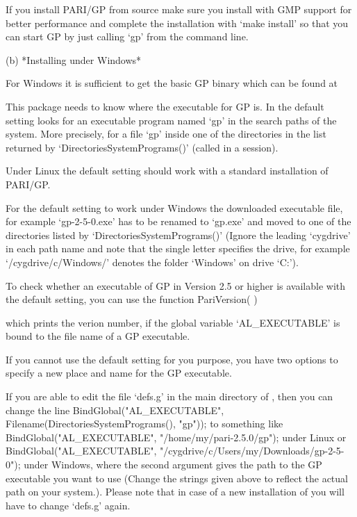 If you install PARI/GP from source make sure you install with GMP
support for better performance and complete the installation with
`make install' so that you can start GP by just calling `gp' from the
command line.

\item{(b)} 
*Installing under Windows*

For Windows it is sufficient to get the basic GP binary which can be found at
\endlist


This package needs to know where the executable for GP is. In the
default setting {\Alnuth} looks for an executable program named `gp' in
the search paths of the system. More precisely, for a file `gp' inside
one of the directories in the list returned by
`DirectoriesSystemPrograms()' (called in a {\GAP} session).

Under Linux the default setting should work with a standard
installation of PARI/GP.

For the default setting to work under Windows the downloaded
executable file, for example `gp-2-5-0.exe' has to be renamed to
`gp.exe' and moved to one of the directories listed by
`DirectoriesSystemPrograms()' (Ignore the leading `cygdrive' in each
path name and note that the single letter specifies the drive, for
example `/cygdrive/c/Windows/' denotes the folder `Windows' on drive
`C:').

To check whether an executable of GP in Version 2.5 or higher is
available with the default setting, you can use the function
\> PariVersion( )

which prints the verion number, if the global variable `AL_EXECUTABLE'
is bound to the file name of a GP executable.

If you cannot use the default setting for you purpose, you have
two options to specify a new place and name for the GP executable.

If you are able to edit the file `defs.g' in the main directory of
{\Alnuth}, then you can change the line 
\beginexample
    BindGlobal("AL_EXECUTABLE", Filename(DirectoriesSystemPrograms(), "gp"));
\endexample
to something like
\beginexample
    BindGlobal("AL_EXECUTABLE", "/home/my/pari-2.5.0/gp");
\endexample 
under Linux or
\beginexample
    BindGlobal("AL_EXECUTABLE", "/cygdrive/c/Users/my/Downloads/gp-2-5-0");
\endexample 
under Windows, where the second argument gives the path to the GP
executable you want to use (Change the strings given above to reflect
the actual path on your system.). Please note that in case of a new
installation of {\Alnuth} you will have to change `defs.g' again. 

